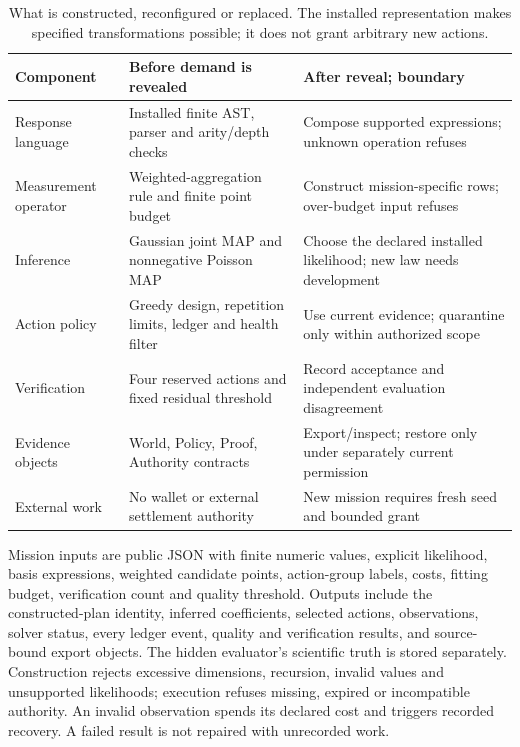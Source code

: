 \documentclass[11pt,letterpaper]{article}
\begin{document}
\begin{table}[htbp]
\centering\small
\begin{tabularx}{\linewidth}{@{}p{.23\linewidth}XX@{}}
\toprule
\textbf{Component} & \textbf{Before demand is revealed} & \textbf{After reveal; boundary}\\
\midrule
Response language & Installed finite AST, parser and arity/depth checks & Compose supported expressions; unknown operation refuses\\
Measurement operator & Weighted-aggregation rule and finite point budget & Construct mission-specific rows; over-budget input refuses\\
Inference & Gaussian joint MAP and nonnegative Poisson MAP & Choose the declared installed likelihood; new law needs development\\
Action policy & Greedy design, repetition limits, ledger and health filter & Use current evidence; quarantine only within authorized scope\\
Verification & Four reserved actions and fixed residual threshold & Record acceptance and independent evaluation disagreement\\
Evidence objects & World, Policy, Proof, Authority contracts & Export/inspect; restore only under separately current permission\\
External work & No wallet or external settlement authority & New mission requires fresh seed and bounded grant\\
\bottomrule
\end{tabularx}
\caption{What is constructed, reconfigured or replaced. The installed representation makes specified transformations possible; it does not grant arbitrary new actions.}
\end{table}

Mission inputs are public JSON with finite numeric values, explicit likelihood, basis expressions, weighted candidate points, action-group labels, costs, fitting budget, verification count and quality threshold. Outputs include the constructed-plan identity, inferred coefficients, selected actions, observations, solver status, every ledger event, quality and verification results, and source-bound export objects. The hidden evaluator's scientific truth is stored separately. Construction rejects excessive dimensions, recursion, invalid values and unsupported likelihoods; execution refuses missing, expired or incompatible authority. An invalid observation spends its declared cost and triggers recorded recovery. A failed result is not repaired with unrecorded work.
\end{document}
